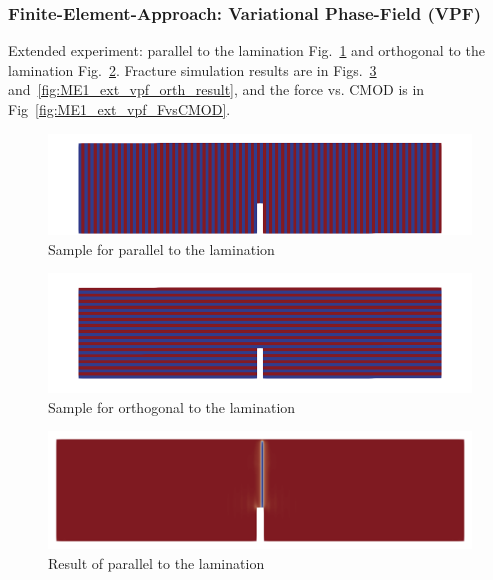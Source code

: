 \subsubsection*{Finite-Element-Approach: Variational Phase-Field (VPF)}

Extended experiment: parallel to the lamination Fig.~\ref{fig:ME1_ext_vpf_para_init} and orthogonal to the lamination Fig.~\ref{fig:ME1_ext_vpf_orth_init}.
Fracture simulation results are in Figs.~\ref{fig:ME1_ext_vpf_para_result} and~\ref{fig:ME1_ext_vpf_orth_result}, and the force vs. CMOD is in Fig~\ref{fig:ME1_ext_vpf_FvsCMOD}.

\begin{figure}[!ht]
\centering
\includegraphics[width=1\textwidth]{figures/ME1_ext_2D_parallel_init.png}
\caption{Sample for parallel to the lamination}
\label{fig:ME1_ext_vpf_para_init}
\end{figure}

\begin{figure}[!ht]
\centering
\includegraphics[width=1\textwidth]{figures/ME1_ext_2D_orthogonal_init.png}
\caption{Sample for orthogonal to the lamination}
\label{fig:ME1_ext_vpf_orth_init}
\end{figure}

\begin{figure}[!ht]
\centering
\includegraphics[width=1\textwidth]{figures/ME1_ext_2D_para_result.png}
\caption{Result of parallel to the lamination}
\label{fig:ME1_ext_vpf_para_result}
\end{figure}

